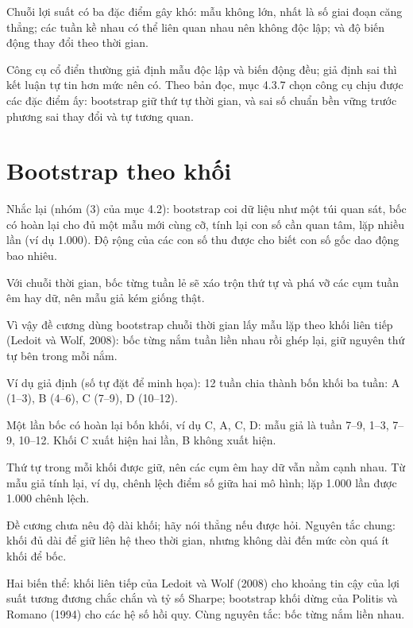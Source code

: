 Chuỗi lợi suất có ba đặc điểm gây khó: mẫu không lớn, nhất là số giai đoạn căng thẳng; các tuần kề nhau có thể liên quan nhau nên không độc lập; và độ biến động thay đổi theo thời gian.

Công cụ cổ điển thường giả định mẫu độc lập và biến động đều; giả định sai thì kết luận tự tin hơn mức nên có. Theo bản đọc, mục 4.3.7 chọn công cụ chịu được các đặc điểm ấy: bootstrap giữ thứ tự thời gian, và sai số chuẩn bền vững trước phương sai thay đổi và tự tương quan.

\section{Bootstrap theo khối}

Nhắc lại (nhóm (3) của mục 4.2): bootstrap coi dữ liệu như một túi quan sát, bốc có hoàn lại cho đủ một mẫu mới cùng cỡ, tính lại con số cần quan tâm, lặp nhiều lần (ví dụ 1.000). Độ rộng của các con số thu được cho biết con số gốc dao động bao nhiêu.

Với chuỗi thời gian, bốc từng tuần lẻ sẽ xáo trộn thứ tự và phá vỡ các cụm tuần êm hay dữ, nên mẫu giả kém giống thật.

Vì vậy đề cương dùng bootstrap chuỗi thời gian lấy mẫu lặp theo khối liên tiếp (Ledoit và Wolf, 2008): bốc từng nắm tuần liền nhau rồi ghép lại, giữ nguyên thứ tự bên trong mỗi nắm.

\begin{tcolorbox}[breakable]
Ví dụ giả định (số tự đặt để minh họa): 12 tuần chia thành bốn khối ba tuần: A (1--3), B (4--6), C (7--9), D (10--12).

Một lần bốc có hoàn lại bốn khối, ví dụ C, A, C, D: mẫu giả là tuần 7--9, 1--3, 7--9, 10--12. Khối C xuất hiện hai lần, B không xuất hiện.

Thứ tự trong mỗi khối được giữ, nên các cụm êm hay dữ vẫn nằm cạnh nhau. Từ mẫu giả tính lại, ví dụ, chênh lệch điểm số giữa hai mô hình; lặp 1.000 lần được 1.000 chênh lệch.
\end{tcolorbox}

Đề cương chưa nêu độ dài khối; hãy nói thẳng nếu được hỏi. Nguyên tắc chung: khối đủ dài để giữ liên hệ theo thời gian, nhưng không dài đến mức còn quá ít khối để bốc.

Hai biến thể: khối liên tiếp của Ledoit và Wolf (2008) cho khoảng tin cậy của lợi suất tương đương chắc chắn và tỷ số Sharpe; bootstrap khối dừng của Politis và Romano (1994) cho các hệ số hồi quy. Cùng nguyên tắc: bốc từng nắm liền nhau.

